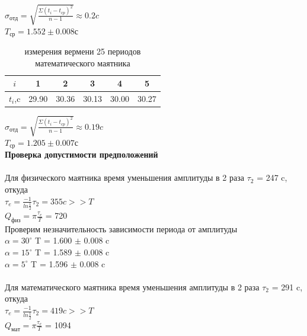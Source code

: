 \documentclass[12pt]{article}
\begin{document}
       $\sigma_{отд} = \sqrt{\frac{\Sigma (t_i - t_{cp})^2 }{n-1}} \approx 0.2 c$ \\
       $T_{ср} = 1.552 \pm 0.008 с$ \\
       
       \begin{table}[ht]
       	\caption{измерения вермени 25 периодов математического маятника}
       	\begin{center}
       		\begin{tabular}{|c|c|c|c|c|c|}
       			\hline 
       			$i$ & 1 & 2 & 3 & 4 & 5 \\
       			\hline
       			$t_i$,c & 29.90 & 30.36 & 30.13 & 30.00 & 30.27 \\
       			\hline
       		\end{tabular}
       	\end{center}
       \end{table}
       
       $\sigma_{отд} = \sqrt{\frac{\Sigma (t_i - t_{cp})^2 }{n-1}} \approx 0.19 c$ \\
       $T_{ср} = 1.205 \pm 0.007 с$ \\   
       
    \textbf{Проверка допустимости предположений} \\ \\
       Для физического маятника время уменьшения амплитуды в 2 раза $\tau_2$ = 247 c, откуда \\
       $\tau_e = \frac{-1}{ln\frac{1}{2}} \tau_2 = 355 c >> T$ \\
       $Q_{физ}=\pi \frac{\tau_e}{T}$ = 720 \\
       Проверим незначительность зависимости периода от амплитуды \\
       $\alpha = 30^\circ$ T = 1.600 $\pm$ 0.008 c \\
       $\alpha = 15^\circ$ T = 1.589 $\pm$ 0.008 c \\
       $\alpha = 5^\circ$ T = 1.596 $\pm$ 0.008 c \\ \\
       
       Для математического маятника время уменьшения амплитуды в 2 раза $\tau_2$ = 291 c, откуда \\
       $\tau_e = \frac{-1}{ln\frac{1}{2}} \tau_2 = 419 c >> T$ \\
       $Q_{мат}=\pi \frac{\tau_e}{T}$ = 1094 \\ \\
       
\end{document}
